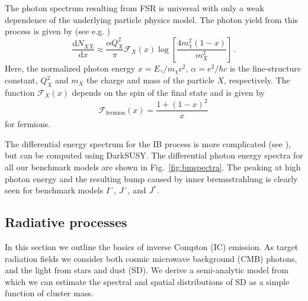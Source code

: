 \documentclass[10pt,aps,pra,reprint,amsmath,amsfonts,amssymb,showpacs]{revtex4-1}
\newcommand{\rmn}{\mathrm}
\newcommand{\dd}{\rmn{d}}
\newcommand{\eg}{E_\gamma}
\begin{document}
The photon spectrum resulting from FSR is universal with only a
weak dependence of the underlying particle physics model. The photon
yield from this process is given by (see
e.g. \cite{2008JHEP...01..049B})
\begin{equation}
\frac{\dd N_{X \bar{X}}}{\dd x} \approx \frac{\alpha Q_X^2}{\pi}
\mathcal{F}_X(x) \log\left[\frac{4 m_\chi^2\left(1-x\right)}{m_X^2}\right]\,.
\end{equation}
Here, the normalized photon energy $x=\eg/m_\chi c^2$, 
$\alpha =e^2/\hbar c$ is the fine-structure constant, 
$Q_X^2$ and $m_X$ the
charge and mass of the particle $X$, respectively. The function
$\mathcal{F}_X(x)$ depends on the spin of the final state and is given
by
\begin{equation}
\mathcal{F}_\rmn{fermion}(x) = \frac{1+\left(1-x\right)^2}{x}\,
\end{equation}
for fermions. 

The differential energy spectrum for the IB process is more
complicated (see \cite{1989PhLB..225..372B,2008JHEP...01..049B}), but
can be computed using {\sc DarkSUSY}. The differential photon energy
spectra for all our benchmark models are shown in
Fig.~\ref{fig:bmspectra}.  The peaking at high photon energy and the
resulting bump caused by inner bremsstrahlung is clearly seen for
benchmark models $I´$, $J´$, and $J^*$.


\subsection{Radiative processes}
In this section we outline the basics of inverse Compton (IC)
emission. As target radiation fields we consider both cosmic microwave
background (CMB) photons, and the light from stars and dust (SD). We
derive a semi-analytic model from which we can estimate the spectral
and spatial distributions of SD as a simple function of cluster mass.
\end{document}
